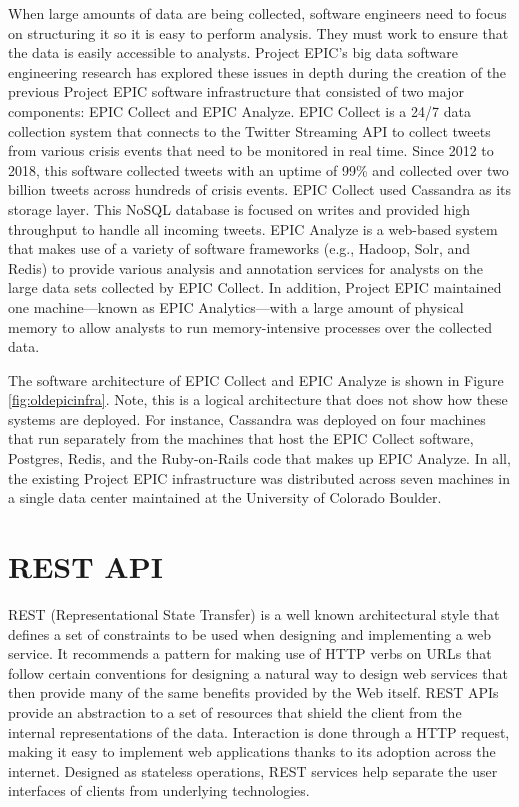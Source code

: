 When large amounts of data are being collected, software engineers need to focus on structuring it so it is easy to perform analysis. They must work to ensure that the data is easily accessible to analysts. Project EPIC's big data software engineering research has explored these issues in depth during the creation of the previous Project EPIC software infrastructure that consisted of two major components: EPIC Collect and EPIC Analyze. EPIC Collect\cite{anderson2011design,schram2012mysql} is a 24/7 data collection system that connects to the Twitter Streaming API to collect tweets from various crisis events that need to be monitored in real time. Since 2012 to 2018, this software collected tweets with an uptime of 99\% and collected over two billion tweets across hundreds of crisis events. EPIC Collect used Cassandra as its storage layer. This NoSQL database is focused on writes and provided high throughput to handle all incoming tweets. EPIC Analyze\cite{anderson2015design,barrenechea2015getting} is a web-based system that makes use of a variety of software frameworks (e.g., Hadoop, Solr, and Redis) to provide various analysis and annotation services for analysts on the large data sets collected by EPIC Collect. In addition, Project EPIC maintained one machine---known as EPIC Analytics---with a large amount of physical memory to allow analysts to run memory-intensive processes over the collected data. 

The software architecture of EPIC Collect and EPIC Analyze is shown in Figure \ref{fig:oldepicinfra}. Note, this is a logical architecture that does not show how these systems are deployed. For instance, Cassandra was deployed on four machines that run separately from the machines that host the EPIC Collect software, Postgres, Redis, and the Ruby-on-Rails code that makes up EPIC Analyze. In all, the existing Project EPIC infrastructure was distributed across seven machines in a single data center maintained at the University of Colorado Boulder.

\section{REST API}

REST (Representational State Transfer) \cite{fielding2000architectural} is a well known architectural style that defines a set of constraints to be used when designing and implementing a web service. It recommends a pattern for making use of HTTP verbs on URLs that follow certain conventions for designing a natural way to design web services that then provide many of the same benefits provided by the Web itself. REST APIs provide an abstraction to a set of resources that shield the client from the internal representations of the data. Interaction is done through a HTTP request, making it easy to implement web applications thanks to its adoption across the internet. Designed as stateless operations, REST services help separate the user interfaces of clients from underlying technologies.

